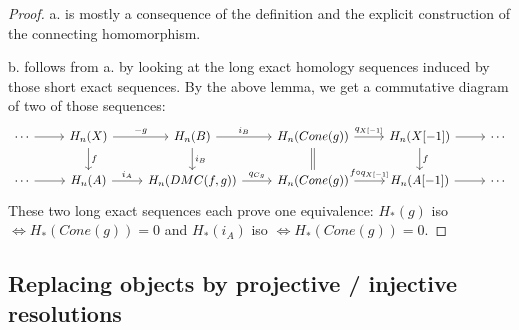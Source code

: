 \documentclass[fontsize=11pt,fleqn,a4paper]{scrartcl}
\begin{document}
\begin{proof}
a. is mostly a consequence of the definition and the explicit construction of the connecting homomorphism.

b. follows from a. by looking at the long exact homology sequences induced by those short exact sequences. By the above lemma, we get a commutative diagram of two of those sequences:
\[\begin{tikzcd}
\cdots \ar[r] & H_n(X) \ar[r,"-g"] \ar[d,"f"] & H_n(B) \ar[r,"i_B"] \ar[d,"i_B"] & H_n(Cone(g)) \ar[r,"q_{X[-1]}"] \ar[d,equal] & H_n(X[-1]) \ar[d,"f"] \ar[r] & \cdots\\
\cdots \ar[r] & H_n(A) \ar[r,"i_A"] & H_n(DMC(f,g)) \ar[r,"q_{Cg}"] & H_n(Cone(g)) \ar[r,"f\circ q_{X[-1]}"] & H_n(A[-1]) \ar[r] & \cdots
\end{tikzcd}\]
These two long exact sequences each prove one equivalence: $H_\ast(g)$ iso $\iff H_\ast(Cone(g)) = 0$ and $H_\ast(i_A)$ iso $\iff H_\ast(Cone(g)) = 0$.
\end{proof}

\subsection{Replacing objects by projective / injective resolutions}
\end{document}

